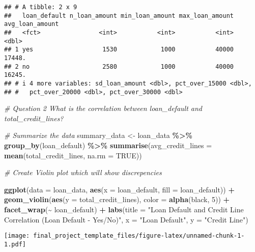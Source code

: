 \documentclass[
]{article}
\newenvironment{Shaded}{\begin{snugshade}}{\end{snugshade}}
\newcommand{\AttributeTok}[1]{\textcolor[rgb]{0.13,0.29,0.53}{#1}}
\newcommand{\CommentTok}[1]{\textcolor[rgb]{0.56,0.35,0.01}{\textit{#1}}}
\newcommand{\ConstantTok}[1]{\textcolor[rgb]{0.56,0.35,0.01}{#1}}
\newcommand{\DecValTok}[1]{\textcolor[rgb]{0.00,0.00,0.81}{#1}}
\newcommand{\FunctionTok}[1]{\textcolor[rgb]{0.13,0.29,0.53}{\textbf{#1}}}
\newcommand{\NormalTok}[1]{#1}
\newcommand{\OtherTok}[1]{\textcolor[rgb]{0.56,0.35,0.01}{#1}}
\newcommand{\SpecialCharTok}[1]{\textcolor[rgb]{0.81,0.36,0.00}{\textbf{#1}}}
\newcommand{\StringTok}[1]{\textcolor[rgb]{0.31,0.60,0.02}{#1}}
\begin{document}
\begin{verbatim}
## # A tibble: 2 x 9
##   loan_default n_loan_amount min_loan_amount max_loan_amount avg_loan_amount
##   <fct>                <int>           <int>           <int>           <dbl>
## 1 yes                   1530            1000           40000          17448.
## 2 no                    2580            1000           40000          16245.
## # i 4 more variables: sd_loan_amount <dbl>, pct_over_15000 <dbl>,
## #   pct_over_20000 <dbl>, pct_over_30000 <dbl>
\end{verbatim}

\begin{Shaded}
\begin{Highlighting}[]
\CommentTok{\# Question 2 What is the correlation between loan\_default and total\_credit\_lines?}

\CommentTok{\# Summarize the data}
\NormalTok{summary\_data }\OtherTok{\textless{}{-}}\NormalTok{ loan\_data }\SpecialCharTok{\%\textgreater{}\%}
  \FunctionTok{group\_by}\NormalTok{(loan\_default) }\SpecialCharTok{\%\textgreater{}\%}
  \FunctionTok{summarise}\NormalTok{(}\AttributeTok{avg\_credit\_lines =} \FunctionTok{mean}\NormalTok{(total\_credit\_lines, }\AttributeTok{na.rm =} \ConstantTok{TRUE}\NormalTok{))}

\CommentTok{\# Create Violin plot which will show discrepencies}

\FunctionTok{ggplot}\NormalTok{(}\AttributeTok{data =}\NormalTok{ loan\_data, }\FunctionTok{aes}\NormalTok{(}\AttributeTok{x =} \StringTok{\textquotesingle{}loan\_default\textquotesingle{}}\NormalTok{, }\AttributeTok{fill =}\NormalTok{ loan\_default)) }\SpecialCharTok{+} 
   \FunctionTok{geom\_violin}\NormalTok{(}\FunctionTok{aes}\NormalTok{(}\AttributeTok{y =}\NormalTok{ total\_credit\_lines), }\AttributeTok{color =} \FunctionTok{alpha}\NormalTok{(}\StringTok{\textquotesingle{}black\textquotesingle{}}\NormalTok{, }\DecValTok{5}\NormalTok{)) }\SpecialCharTok{+}
   \FunctionTok{facet\_wrap}\NormalTok{(}\SpecialCharTok{\textasciitilde{}}\NormalTok{ loan\_default) }\SpecialCharTok{+}
   \FunctionTok{labs}\NormalTok{(}\AttributeTok{title =} \StringTok{"Loan Default and Credit Line Correlation (Loan Default {-} Yes/No)"}\NormalTok{,}
          \AttributeTok{x =} \StringTok{"Loan Default"}\NormalTok{, }\AttributeTok{y =} \StringTok{"Credit Line"}\NormalTok{) }
\end{Highlighting}
\end{Shaded}

\texttt{[image: final\_project\_template\_files/figure-latex/unnamed-chunk-1-1.pdf]}
\end{document}
